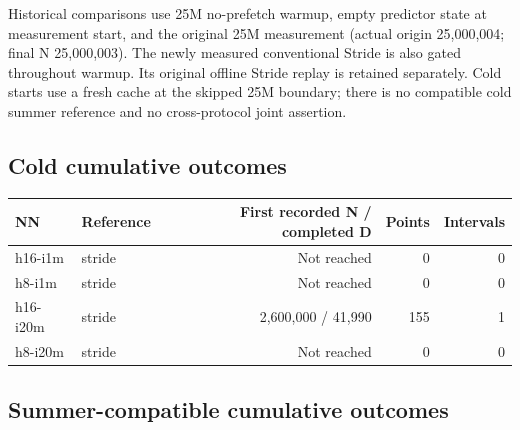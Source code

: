 \documentclass[10pt]{article}
\begin{document}
Historical comparisons use 25M no-prefetch warmup, empty predictor state at measurement start, and the original 25M measurement (actual origin 25,000,004; final N 25,000,003). The newly measured conventional Stride is also gated throughout warmup. Its original offline Stride replay is retained separately. Cold starts use a fresh cache at the skipped 25M boundary; there is no compatible cold summer reference and no cross-protocol joint assertion.

\subsection{Cold cumulative outcomes}

\begin{center}\scriptsize
\begin{tabular}{llrrr}
\toprule
NN & Reference & First recorded N / completed D & Points & Intervals \\
\midrule
h16-i1m & stride & Not reached & 0 & 0 \\
h8-i1m & stride & Not reached & 0 & 0 \\
h16-i20m & stride & 2,600,000 / 41,990 & 155 & 1 \\
h8-i20m & stride & Not reached & 0 & 0 \\
\bottomrule
\end{tabular}\end{center}

\subsection{Summer-compatible cumulative outcomes}
\end{document}
